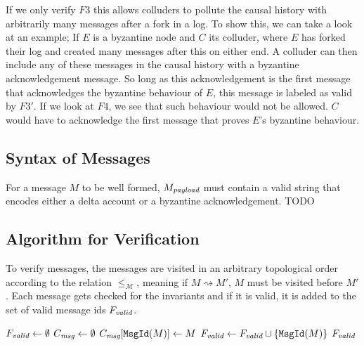 \documentclass{article}
\begin{document}
If we only verify $F3$ this allows colluders to pollute the causal history with arbitrarily many messages after a fork in a log. To show this, we can take a look at an example; If $E$ is a byzantine node and $C$ its colluder, where $E$ has forked their log and created many messages after this on either end. A colluder can then include any of these messages in the causal history with a byzantine acknowledgement message. So long as this acknowledgement is the first message that acknowledges the byzantine behaviour of $E$, this message is labeled as valid by $F3'$. If we look at $F4$, we see that such behaviour would not be allowed. $C$ would have to acknowledge the first message that proves $E$'s byzantine behaviour.

\subsection{Syntax of Messages}
\label{sec:syntax-of-msgs}
For a message $M$ to be well formed, $M_\emph{payload}$ must contain a valid string that encodes either a delta account or a byzantine acknowledgement.
TODO

\subsection{Algorithm for Verification}
To verify messages, the messages are visited in an arbitrary topological order according to the relation $\le_\mathcal{M}$, meaning if $M \rightsquigarrow M'$, $M$ must be visited before $M'$. Each message gets checked for the invariants and if it is valid, it is added to the set of valid message ids $F_\emph{valid}$.

\begin{algorithm}[ht]
\caption{Basic structure of the verifying algorithm}
\begin{algorithmic}[1]
    \State $F_\emph{valid} \gets \emptyset$ 
    \State $C_\emph{msg} \gets \emptyset$ 
        \State $C_\emph{msg}[\texttt{MsgId}(M)] \gets M$
            \State $F_\emph{valid} \gets F_\emph{valid} \cup \{\texttt{MsgId}(M)\}$ 
        \EndIf
    \EndFor
    \State \Return $F_\emph{valid}$
\EndFunction
\end{algorithmic}
\end{algorithm}
\end{document}
